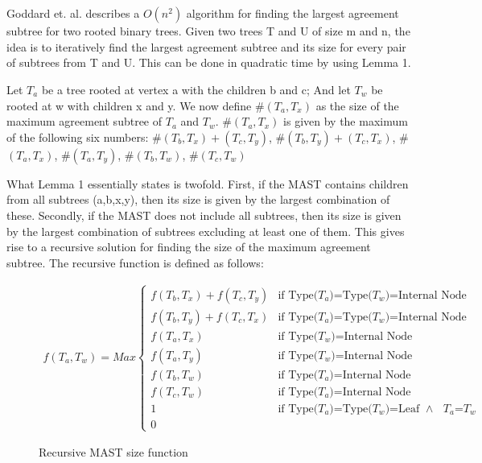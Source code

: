 \chapter{}
Goddard et. al.\cite{nsquared} describes a $O(n^2)$ algorithm for finding the largest agreement subtree for two rooted binary trees. Given two trees T and U of size m and n, the idea is to iteratively find the largest agreement subtree and its size for every pair of subtrees from T and U. This can be done in quadratic time by using Lemma 1. 

\begin{Lemma}
	Let $T_a$ be a tree rooted at vertex a with the children b and c; And let $T_w$ be rooted at w with children x and y. We now define $\#(T_a,T_x)$ as the size of the maximum agreement subtree of $T_a$ and $T_w$.  $\#(T_a,T_x)$ is given by the maximum of the following six numbers: \#$(T_b,T_x)+(T_c,T_y)$,
	\#$(T_b,T_y)+(T_c,T_x)$,
	\#$(T_a,T_x)$,
	\#$(T_a,T_y)$,
	\#$(T_b,T_w)$,
	\#$(T_c,T_w)$
\end{Lemma}

What Lemma 1 essentially states is twofold. First, if the MAST contains children from all subtrees (a,b,x,y), then its size is given by the largest combination of these. Secondly, if the MAST does not include all subtrees, then its size is given by the largest combination of subtrees excluding at least one of them.    
This gives rise to a recursive solution for finding the size of the maximum agreement subtree. The recursive function is defined as follows: 

\begin{figure}
	\begin{equation*}
	\begin{aligned}
	f(T_a,T_w)=Max
	\begin{cases}
	f(T_b,T_x)+f(T_c,T_y) & \text{if Type($T_a$)=Type($T_w$)=Internal Node}
	\\
	f(T_b,T_y)+f(T_c,T_x) & \text{if Type($T_a$)=Type($T_w$)=Internal Node}
	\\
	f(T_a, T_x)           & \text{if Type($T_w$)=Internal Node}
	\\
	f(T_a, T_y)           & \text{if Type($T_w$)=Internal Node}
	\\
	f(T_b, T_w)           & \text{if Type($T_a$)=Internal Node}
	\\
	f(T_c, T_w)           & \text{if Type($T_a$)=Internal Node}
	\\
	1 	                  & \text{if Type($T_a$)=Type($T_w$)=Leaf  $\land$  $T_a$=$T_w$}
	\\
	0                     
	\end{cases}
	\end{aligned}
	\phantom{\hspace{6cm}}
	\end{equation*}
	\caption{Recursive MAST size function}
	\label{Fig:Function1}
\end{figure}


